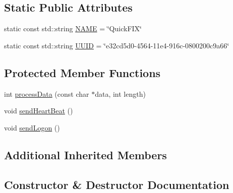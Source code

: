 \subsection*{Static Public Attributes}
\begin{DoxyCompactItemize}
\item 
static const std\+::string \hyperlink{classMetal_1_1QuickFIX_1_1QuickFIXAdapter_aad5f72f920f26469fa0192dcbdb3a59a}{N\+A\+M\+E} = \char`\"{}Quick\+F\+I\+X\char`\"{}
\item 
static const std\+::string \hyperlink{classMetal_1_1QuickFIX_1_1QuickFIXAdapter_aa8a9ed777bdbc2c9a138fa35741da77a}{U\+U\+I\+D} = \char`\"{}e32cd5d0-\/4564-\/11e4-\/916c-\/0800200c9a66\char`\"{}
\end{DoxyCompactItemize}
\subsection*{Protected Member Functions}
\begin{DoxyCompactItemize}
\item 
int \hyperlink{classMetal_1_1QuickFIX_1_1QuickFIXAdapter_a0598785e8408706cde97d532090d3fcb}{process\+Data} (const char $\ast$data, int length)
\item 
void \hyperlink{classMetal_1_1QuickFIX_1_1QuickFIXAdapter_a6bb8af5a8dd9c4ad157bce0e8ef35ef1}{send\+Heart\+Beat} ()
\item 
void \hyperlink{classMetal_1_1QuickFIX_1_1QuickFIXAdapter_a3f9dba36bbaa3d8db8af62ac07a9fff5}{send\+Logon} ()
\end{DoxyCompactItemize}
\subsection*{Additional Inherited Members}


\subsection{Constructor \& Destructor Documentation}
\hypertarget{classMetal_1_1QuickFIX_1_1QuickFIXAdapter_ac437c5ed10c4b0ed06a49b31d194be70}{}
